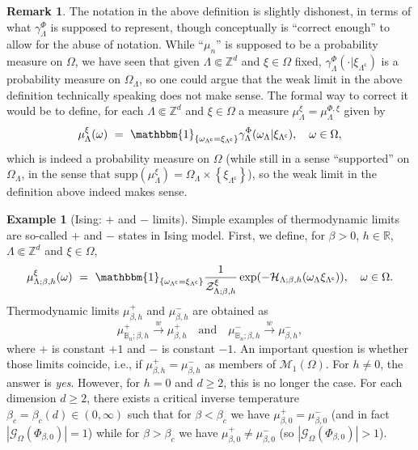 \documentclass[12pt]{article}
\newcommand{\BBB}{\mathbb{B}}
\newcommand{\G}{\mathcal{G}}
\renewcommand{\H}{\mathcal{H}}
\newcommand{\M}{\mathcal{M}}
\newcommand{\R}{\mathbb{R}}
\newcommand{\Z}{\mathbb{Z}}
\newcommand{\ZZ}{\mathcal{Z}}
\newcommand{\set}[1]{\left\{#1\right\}}
\newcommand{\pika}{\boldsymbol{\cdot}}
\newcommand{\1}{\mathbbm{1}}
\renewcommand{\c}{\mathsf{c}}
\newcommand{\supp}{\mathrm{supp}}
\newcommand{\5}{\vspace{0.5cm}}
\theoremstyle{definition}
\newtheorem{ex}[thm]{Example}
\newtheorem{rem}[thm]{Remark}
\begin{document}
\begin{rem}\label{rem:InfVol}
The notation in the above definition is slightly dishonest, in terms of what $\gamma_\Lambda^\Phi$ is supposed to represent, though conceptually is ``correct enough'' to allow for the abuse of notation. While ``$\mu_n$'' is supposed to be a probability measure on $\Omega$, we have seen that given $\Lambda\Subset\Z^d$ and $\xi\in\Omega$ fixed, $\gamma_\Lambda^\Phi(\pika|\xi_{\Lambda^\c})$ is a probability measure on $\Omega_\Lambda$, so one could argue that the weak limit in the above definition technically speaking does not make sense. The formal way to correct it would be to define, for each $\Lambda\Subset\Z^d$ and $\xi\in\Omega$ a measure $\mu_\Lambda^\xi=\mu_\Lambda^{\Phi,\xi}$ given by
$$\mu_\Lambda^\xi(\omega) ~=~ \1_{\set{\omega_{\Lambda^\c}=\xi_{\Lambda^\c}}}\gamma_\Lambda^\Phi(\omega_\Lambda|\xi_{\Lambda^\c}), \quad \omega\in\Omega,$$
which is indeed a probability measure on $\Omega$ (while still in a sense ``supported'' on $\Omega_\Lambda$, in the sense that $\supp(\mu_\Lambda^\xi)=\Omega_\Lambda\times\set{\xi_{\Lambda^\c}}$), so the weak limit in the definition above indeed makes sense.
\end{rem}

\begin{ex}[Ising: $+$ and $-$ limits]
Simple examples of thermodynamic limits are so-called $+$ and $-$ states in Ising model. First, we define, for $\beta>0$, $h\in\R$, $\Lambda\Subset\Z^d$ and $\xi\in\Omega$,
$$\mu_{\Lambda;\beta,h}^\xi(\omega) ~=~ \1_{\set{\omega_{\Lambda^\c}=\xi_{\Lambda^\c}}}\frac{1}{\ZZ_{\Lambda;\beta,h}^\xi}\exp(-\H_{\Lambda;\beta,h}(\omega_\Lambda\xi_{\Lambda^\c})), \quad \omega\in\Omega.$$
Thermodynamic limits $\mu_{\beta,h}^{+}$ and $\mu_{\beta,h}^{-}$ are obtained as 
$$\mu_{\BBB_n;\beta,h}^+\xrightarrow{w}\mu_{\beta,h}^+ \quad\text{and}\quad \mu_{\BBB_n;\beta,h}^-\xrightarrow{w}\mu_{\beta,h}^-,$$
where $+$ is constant $+1$ and $-$ is constant $-1$. An important question is whether those limits coincide, i.e., if $\mu_{\beta,h}^+=\mu_{\beta,h}^-$ as members of $\M_1(\Omega)$. For $h\neq 0$, the answer is \textit{yes}. However, for $h=0$ and $d\geq 2$, this is no longer the case. For each dimension $d\geq 2$, there exists a critical inverse temperature $\beta_c=\beta_c(d)\in(0,\infty)$ such that for $\beta<\beta_c$ we have $\mu_{\beta,0}^+=\mu_{\beta,0}^-$ (and in fact $|\G_\Omega(\Phi_{\beta,0})|=1$) while for $\beta>\beta_c$ we have $\mu_{\beta,0}^+\neq\mu_{\beta,0}^-$ (so $|\G_{\Omega}(\Phi_{\beta,0})|>1$).
\end{ex}
\end{document}
